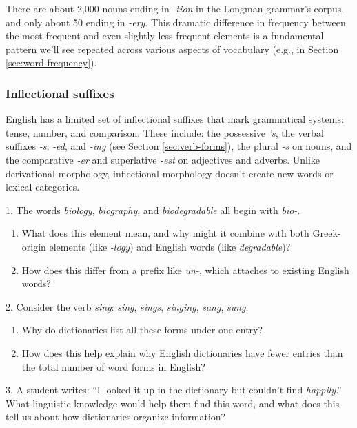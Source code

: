 There are about 2,000 nouns ending in \textit{-tion} in the Longman grammar's corpus, and only about 50 ending in \textit{-ery}. This dramatic difference in frequency between the most frequent and even slightly less frequent elements is a fundamental pattern we'll see repeated across various aspects of vocabulary (e.g., in Section \ref{sec:word-frequency}).

\subsubsection*{Inflectional suffixes}

English has a limited set of inflectional suffixes that mark grammatical systems: tense, number, and comparison. These include: the possessive \textit{'s}, the verbal suffixes \textit{-s}, \textit{-ed}, and \textit{-ing} (see Section \ref{sec:verb-forms}), the plural \textit{-s} on nouns, and the comparative \textit{-er} and superlative \textit{-est} on adjectives and adverbs. Unlike derivational morphology, inflectional morphology doesn't create new words or lexical categories.

\begin{tcolorbox}[title=Exercise: Understanding Word Structure, colback=white, colframe=blue!75!black, fonttitle=\bfseries]
1. The words \textit{biology}, \textit{biography}, and \textit{biodegradable} all begin with \textit{bio-}. 
 \begin{enumerate}[nosep]
 \item What does this element mean, and why might it combine with both Greek-origin elements (like \textit{-logy}) and English words (like \textit{degradable})?
 \item How does this differ from a prefix like \textit{un-}, which attaches to existing English words?
 \end{enumerate}

2. Consider the verb \textit{sing}: \textit{sing}, \textit{sings}, \textit{singing}, \textit{sang}, \textit{sung}.
 \begin{enumerate}[nosep]
 \item Why do dictionaries list all these forms under one entry?
 \item How does this help explain why English dictionaries have fewer entries than the total number of word forms in English?
 \end{enumerate}

3. A student writes: ``I looked it up in the dictionary but couldn't find \textit{happily}.'' 
 What linguistic knowledge would help them find this word, and what does this tell us about how dictionaries organize information?
\end{tcolorbox}

